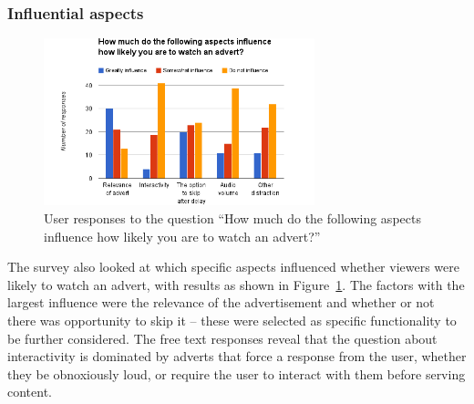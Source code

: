 \subsubsection{Influential aspects}
\label{sec:prestudy_influence}
\begin{figure}[H]
	\centering
	\vspace{-10pt}
	\includegraphics[width=0.7\textwidth, clip=true, trim=0 0 0 60pt]{images/prestudy_influence.png}
	\caption{User responses to the question ``How much do the following aspects influence how likely you are to watch an advert?''}
	\label{fig:prestudy_influence}
	\vspace{-25pt}
\end{figure}
The survey also looked at which specific aspects influenced whether viewers were likely to watch an advert, with results as shown in Figure~\ref{fig:prestudy_influence}. The factors with the largest influence were the relevance of the advertisement and whether or not there was opportunity to skip it -- these were selected as specific functionality to be further considered. 
The free text responses reveal that the question about interactivity is dominated by adverts that force a response from the user, whether they be obnoxiously loud, or require the user to interact with them before serving content. 



